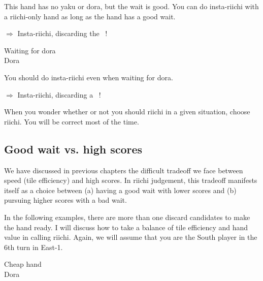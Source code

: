 \noindent This hand has no {\jap yaku} or {\jap dora}, but the wait is good. You can do insta-{\jap riichi} with a {\jap riichi}-only hand as long as the hand has a good wait. 

\begin{center}
{\large $\Rightarrow$ Insta-{\jap riichi}, discarding the ~!}
\end{center}


\bigskip
\begin{itembox}[r]{Waiting for {\jap dora}}
\bp
{}~~\\
\hspace{311pt}\footnotesize{\jap Dora}
\ep
\vspace{-15pt}
\end{itembox}

\noindent You should do insta-{\jap riichi} even when waiting for {\jap dora}. 

\begin{center}
{\large $\Rightarrow$ Insta-{\jap riichi}, discarding a ~!}
\end{center}

\noindent When you wonder whether or not you should {\jap riichi} in a given situation, choose {\jap riichi}. You will be correct most of the time. 

\subsection{Good wait vs. high scores}
\bigskip
We have discussed in previous chapters the difficult tradeoff we face between speed (tile efficiency) and high scores. In {\jap riichi} judgement, this tradeoff manifests itself as a choice between (a) having a good wait with lower scores and (b) pursuing higher scores with a bad wait.

\bigskip
In the following examples, there are more than one discard candidates to make the hand ready. I will discuss how to take a balance of tile efficiency and hand value in calling {\jap riichi}. Again, we will assume that you are the South player in the 6th turn in East-1.

\newpage
\begin{itembox}[r]{Cheap hand}
\bp
{}\bai\bai~~\bei\\
\hspace{311pt}\footnotesize{\jap Dora}
\ep
\vspace{-15pt}
\end{itembox}


